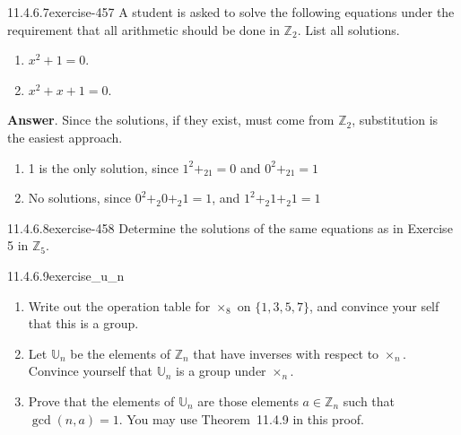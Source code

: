 \documentclass[twoside,10pt,]{book}
\numberwithin{equation}{section}
\begin{document}
\begin{divisionsolution}{11.4.6.7}{}{exercise-457}%
\hypertarget{p-4058}{}%
A student is asked to solve the following equations under the requirement that all arithmetic should be done in \(\mathbb{Z}_2\). List all solutions.\leavevmode%
\begin{enumerate}[label=(\alph*)]
\item\hypertarget{li-1845}{}\hypertarget{p-4059}{}%
\(x^2 + 1 = 0\).%
\item\hypertarget{li-1846}{}\hypertarget{p-4060}{}%
\(x^2 + x + 1 = 0\).%
\end{enumerate}
%
\par\smallskip%
\noindent\textbf{Answer}.\quad%
\hypertarget{p-4061}{}%
Since the solutions, if they exist, must come from \(\mathbb{Z}_2\), substitution is the easiest approach.\leavevmode%
\begin{enumerate}[label=(\alph*)]
\item\hypertarget{li-1847}{}\hypertarget{p-4062}{}%
1 is the only solution, since  \(1^2+_21=0\)   and  \(0^2+_21=1\)%
\item\hypertarget{li-1848}{}\hypertarget{p-4063}{}%
No solutions, since \(0^2+_2 0+_2 1=1\), and  \(1^2+_2 1+_2 1=1\)%
\end{enumerate}
%
\end{divisionsolution}%
\begin{divisionsolution}{11.4.6.8}{}{exercise-458}%
\hypertarget{p-4064}{}%
Determine the solutions of the same equations as in Exercise 5 in \(\mathbb{Z}_5\).%
\end{divisionsolution}%
\begin{divisionsolution}{11.4.6.9}{}{exercise_u_n}%
\hypertarget{p-4065}{}%
\leavevmode%
\begin{enumerate}[label=(\alph*)]
\item\hypertarget{li-1849}{}\hypertarget{p-4066}{}%
Write out the operation table for \(\times_8\) on \(\{1,3,5,7\}\), and convince your self that this is a group.%
\item\hypertarget{li-1850}{}\hypertarget{p-4067}{}%
Let \(\mathbb{U}_{n}\) be the elements of \(\mathbb{Z}_{n}\) that have inverses with respect to \(\times_{n}\).  Convince yourself that \(\mathbb{U}_{n}\) is a group under \(\times_{n}\).%
\item\hypertarget{li-1851}{}\hypertarget{p-4068}{}%
Prove that the elements of \(\mathbb{U}_{n}\)  are those elements  \(a\in \mathbb{Z}_{n} \) such that \(\gcd(n,a)=1\).  You may use  Theorem~11.4.9 in this proof.%
\end{enumerate}
%
\end{divisionsolution}%
\end{document}
